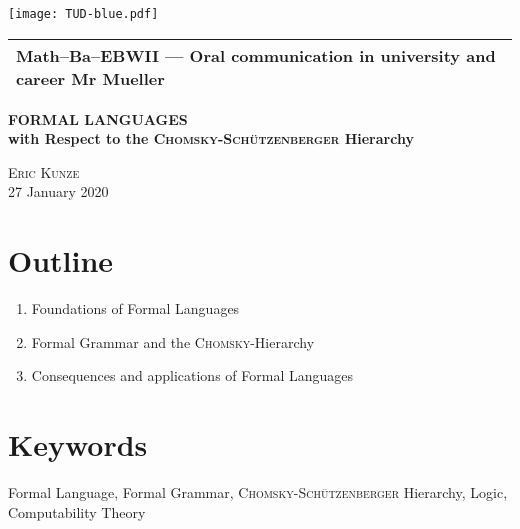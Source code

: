 \documentclass[a4paper, 12pt]{article}
\newcommand{\person}[1]{\textsc{#1}}
\begin{document}
	
	\hspace{-18.6mm}
	\texttt{[image: TUD-blue.pdf]} \\
		\setlength{\tabcolsep}{0pt}
		\begin{tabular}{p{\textwidth}}
			\hline
			\small \sffamily \textbf{Math--Ba--EBWII --- Oral communication in university and career}  Mr Mueller  \\
			\hline
		\end{tabular} 
		\par 
		\vspace{3\parskip}
	\begin{center}
		\bfseries \large \MakeUppercase{Formal Languages}  \\
		\mdseries \smaller with Respect to the \person{Chomsky}-\person{Schützenberger} Hierarchy
		
		{\scshape \normalsize Eric Kunze} \\		
		{\footnotesize 27 January 2020}
	\end{center}
	
	\vspace{2\parskip}
	

	\section*{Outline}
	\begin{enumerate}
		\item Foundations of Formal Languages
		\item Formal Grammar and the \person{Chomsky}-Hierarchy
		\item Consequences and applications of Formal Languages
	\end{enumerate}
	

	\section*{Keywords}
	Formal Language, Formal Grammar, \person{Chomsky}-\person{Schützenberger} Hierarchy, Logic, Computability Theory
	
\end{document}
